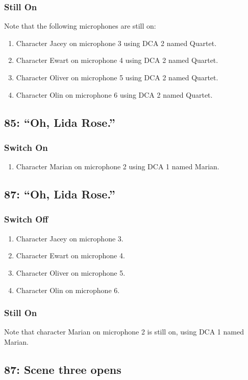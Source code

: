 \subsubsection* {Still On}
Note that the following microphones are still on:
\begin{enumerate}
\item Character Jacey on microphone 3 using DCA 2 named Quartet.
\item Character Ewart on microphone 4 using DCA 2 named Quartet.
\item Character Oliver on microphone 5 using DCA 2 named Quartet.
\item Character Olin on microphone 6 using DCA 2 named Quartet.
\end{enumerate}
\subsection* {85: ``Oh, Lida Rose.''}
\subsubsection* {Switch On}
\begin{enumerate}
\item Character Marian on microphone 2 using DCA 1 named Marian.
\end{enumerate}
\subsection* {87: ``Oh, Lida Rose.''}
\subsubsection* {Switch Off}
\begin{enumerate}
\item Character Jacey on microphone 3.
\item Character Ewart on microphone 4.
\item Character Oliver on microphone 5.
\item Character Olin on microphone 6.
\end{enumerate}
\subsubsection* {Still On}
Note that character Marian on microphone 2 is still on, using DCA 1 named Marian.\subsection* {87: Scene three opens}
